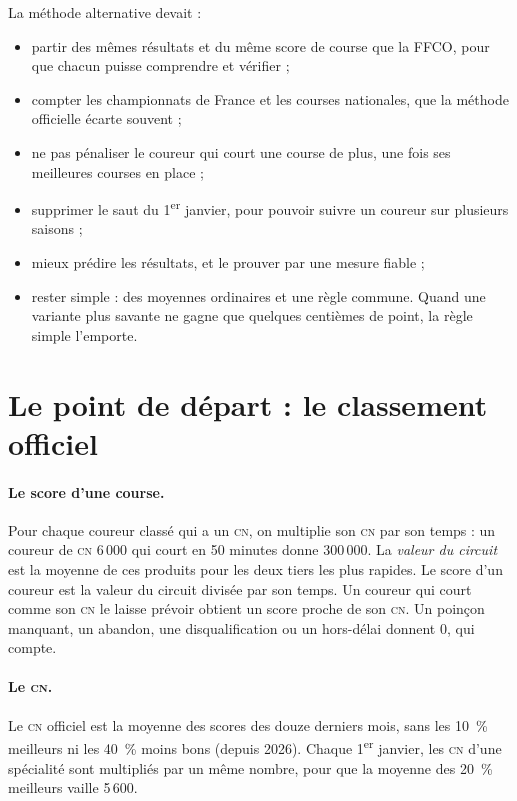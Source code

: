 \documentclass[11pt,a4paper]{article}
\newcommand{\CN}{\textsc{cn}}
\begin{document}
La méthode alternative devait :
\begin{itemize}
  \item partir des mêmes résultats et du même score de course que la FFCO, pour que chacun puisse comprendre et vérifier ;
  \item compter les championnats de France et les courses nationales, que la méthode officielle écarte souvent ;
  \item ne pas pénaliser le coureur qui court une course de plus, une fois ses meilleures courses en place ;
  \item supprimer le saut du 1\textsuperscript{er} janvier, pour pouvoir suivre un coureur sur plusieurs saisons ;
  \item mieux prédire les résultats, et le prouver par une mesure fiable ;
  \item rester simple : des moyennes ordinaires et une règle commune. Quand une variante plus savante ne gagne que quelques centièmes de point, la règle simple l'emporte.
\end{itemize}

\section{Le point de départ : le classement officiel}

\paragraph{Le score d'une course.} Pour chaque coureur classé qui a un \CN, on multiplie son \CN{} par son temps : un coureur de \CN{} 6\,000 qui court en 50 minutes donne 300\,000. La \emph{valeur du circuit} est la moyenne de ces produits pour les deux tiers les plus rapides. Le score d'un coureur est la valeur du circuit divisée par son temps. Un coureur qui court comme son \CN{} le laisse prévoir obtient un score proche de son \CN. Un poinçon manquant, un abandon, une disqualification ou un hors-délai donnent 0, qui compte.

\paragraph{Le \CN.} Le \CN{} officiel est la moyenne des scores des douze derniers mois, sans les 10~\% meilleurs ni les 40~\% moins bons (depuis 2026). Chaque 1\textsuperscript{er} janvier, les \CN{} d'une spécialité sont multipliés par un même nombre, pour que la moyenne des 20~\% meilleurs vaille 5\,600.
\end{document}
